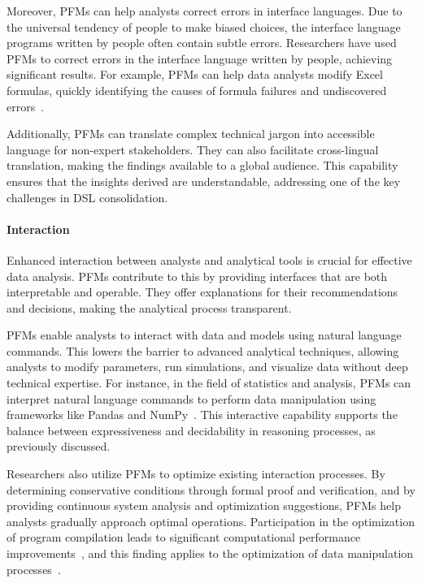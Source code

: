   Moreover, PFMs can help analysts correct errors in interface languages. Due to the universal tendency of people to make biased choices, the interface language programs written by people often contain subtle errors. Researchers have used PFMs to correct errors in the interface language written by people, achieving significant results. For example, PFMs can help data analysts modify Excel formulas, quickly identifying the causes of formula failures and undiscovered errors~\cite{Bavishi2022NeurosymbolicRF}.
  
  Additionally, PFMs can translate complex technical jargon into accessible language for non-expert stakeholders. They can also facilitate cross-lingual translation, making the findings available to a global audience. This capability ensures that the insights derived are understandable, addressing one of the key challenges in DSL consolidation.
  
  \paragraph{Interaction}
  
  Enhanced interaction between analysts and analytical tools is crucial for effective data analysis. PFMs contribute to this by providing interfaces that are both interpretable and operable. They offer explanations for their recommendations and decisions, making the analytical process transparent.
  
  PFMs enable analysts to interact with data and models using natural language commands. This lowers the barrier to advanced analytical techniques, allowing analysts to modify parameters, run simulations, and visualize data without deep technical expertise. For instance, in the field of statistics and analysis, PFMs can interpret natural language commands to perform data manipulation using frameworks like Pandas and NumPy~\cite{lai2023ds}. This interactive capability supports the balance between expressiveness and decidability in reasoning processes, as previously discussed.
  
  Researchers also utilize PFMs to optimize existing interaction processes. By determining conservative conditions through formal proof and verification, and by providing continuous system analysis and optimization suggestions, PFMs help analysts gradually approach optimal operations. Participation in the optimization of program compilation leads to significant computational performance improvements~\cite{cummins2023large, cummins2024meta}, and this finding applies to the optimization of data manipulation processes~\cite{li2024can}.
  
